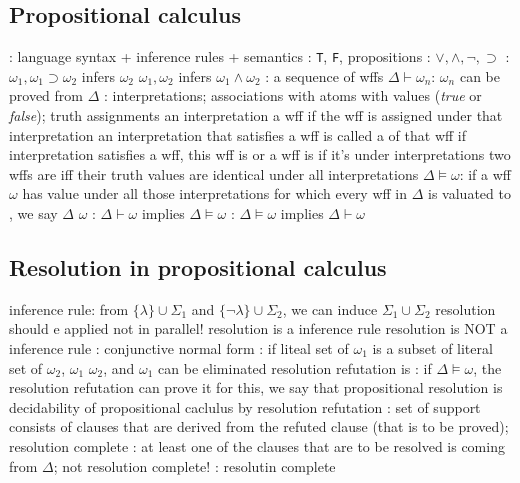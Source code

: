 \documentclass{note}
\begin{document}
\subsection{Propositional calculus}
\bit
\w {}: language syntax + inference rules + semantics
\w {}
	\bit
	\w {}: \verb+T+, \verb+F+, propositions
	\w {}: $\vee, \wedge, \neg, \supset$
	\eit
\w {}
	\bit
	\w {}: $\omega_1, \omega_1 \supset \omega_2$ 
		infers $\omega_2$
	\w  $\omega_1, \omega_2$ 
		infers $\omega_1 \wedge \omega_2$
	\eit
\w {}: a sequence of wffs
	\bit
	\w $\Delta \vdash \omega_n$:  $\omega_n$ can be
		proved from $\Delta$
	\eit
\w {}: interpretations; associations with atoms
	with values ({\em true\/} or {\em false\/}); truth assignments
\w an interpretation  a wff if the wff is assigned
	 under that interpretation
	\bit
	\w an interpretation that satisfies a wff is called 
		a  of that wff
	\eit
\w if  interpretation satisfies a wff, this wff is 
	 or 
\w a wff is  if it's  under  interpretations
\w two wffs are  iff their truth values are identical
	under all interpretations
\w $\Delta \models \omega$: 
	if a wff $\omega$ has value  under all those interpretations
	for which every wff in $\Delta$ is valuated to ,
	we say $\Delta$  $\omega$
\w {}: 
	$\Delta \vdash \omega$ implies  $\Delta \models \omega$
\w {}: 
	$\Delta \models \omega$ implies $\Delta \vdash \omega$
\eit

\subsection{Resolution in propositional calculus}
\bit
\w {} inference rule:
	from $\{\lambda\} \cup \Sigma_1$ and $\{\neg\lambda\} \cup \Sigma_2$,
	we can induce $\Sigma_1 \cup \Sigma_2$
	\bit
	\w resolution should e applied  not in parallel!
	\w resolution is a  inference rule
	\w resolution is NOT a  inference rule
	\eit
\w {}: conjunctive normal form
	\bit
	\w {}: if liteal set of $\omega_1$ is a subset of
		literal set of $\omega_2$, $\omega_1$  
		$\omega_2$, and $\omega_1$ can be eliminated
	\eit
\w {}
	\bit
	\w resolution refutation is :
		if $\Delta \models \omega$, the resolution refutation
		can prove it
	\w for this,
		we say that propositional resolution is 
	\w decidability of propositional caclulus by 
		resolution refutation
	\eit
\w {}
	\bit
	\w {}: set of support consists of clauses
		that are derived from the refuted clause (that is to be
		proved); resolution complete
	\w {}: at least one of the clauses that are to be
		resolved is coming from $\Delta$; not resolution complete!
	\w {}: resolutin complete
		
\end{document}
